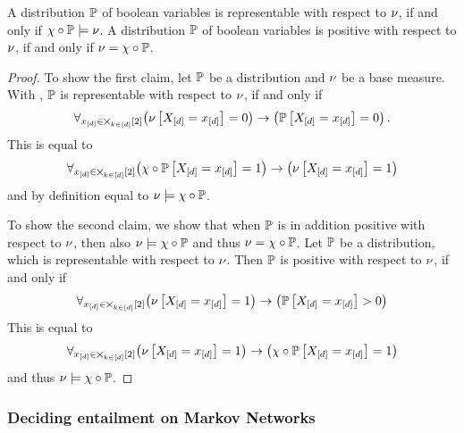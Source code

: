 \begin{theorem}\label{the:minimalRepPosBaseMeasure}
	A distribution $\mathbb{P}$ of boolean variables is representable with respect to $\nu$, if and only if $\chi\circ\mathbb{P}\models\nu$.
	A distribution $\mathbb{P}$ of boolean variables is positive with respect to $\nu$, if and only if $\nu=\chi\circ\mathbb{P}$.
\end{theorem}
\begin{proof}
	To show the first claim, let $\mathbb{P}$ be a distribution and $\nu$ be a base measure.
	With , $\mathbb{P}$ is representable with respect to $\nu$, if and only if
		\[ \forall_{x_{[d]}\in\bigtimes_{k\in[d]}[2]} \big(\nu\left[X_{[d]}=x_{[d]}\right]=0\big) \rightarrow \big(\mathbb{P}\left[X_{[d]}=x_{[d]}\right]=0\big) \, .  \]
	This is equal to
		\[ \forall_{x_{[d]}\in\bigtimes_{k\in[d]}[2]} \big(\chi\circ\mathbb{P}\left[X_{[d]}=x_{[d]}\right]=1\big) \rightarrow \big(\nu\left[X_{[d]}=x_{[d]}\right]=1\big)    \]
	and by definition  equal to $\nu\models\chi\circ\mathbb{P}$.
	
	To show the second claim, we show that when $\mathbb{P}$ is in addition positive with respect to $\nu$, then also $\nu\models\chi\circ\mathbb{P}$ and thus $\nu=\chi\circ\mathbb{P}$.
	Let $\mathbb{P}$ be a distribution, which is representable with respect to $\nu$.
	Then $\mathbb{P}$ is positive with respect to $\nu$, if and only if
		\[ \forall_{x_{[d]}\in\bigtimes_{k\in[d]}[2]} \big(\nu\left[X_{[d]}=x_{[d]}\right]=1\big) \rightarrow \big(\mathbb{P}\left[X_{[d]}=x_{[d]}\right]>0\big)   \]
	This is equal to
		\[ \forall_{x_{[d]}\in\bigtimes_{k\in[d]}[2]} \big(\nu\left[X_{[d]}=x_{[d]}\right]=1\big) \rightarrow \big(\chi\circ\mathbb{P}\left[X_{[d]}=x_{[d]}\right]=1\big)   \]
	and thus $\nu\models\chi\circ\mathbb{P}$.
\end{proof}



\subsubsection{Deciding entailment on Markov Networks}



